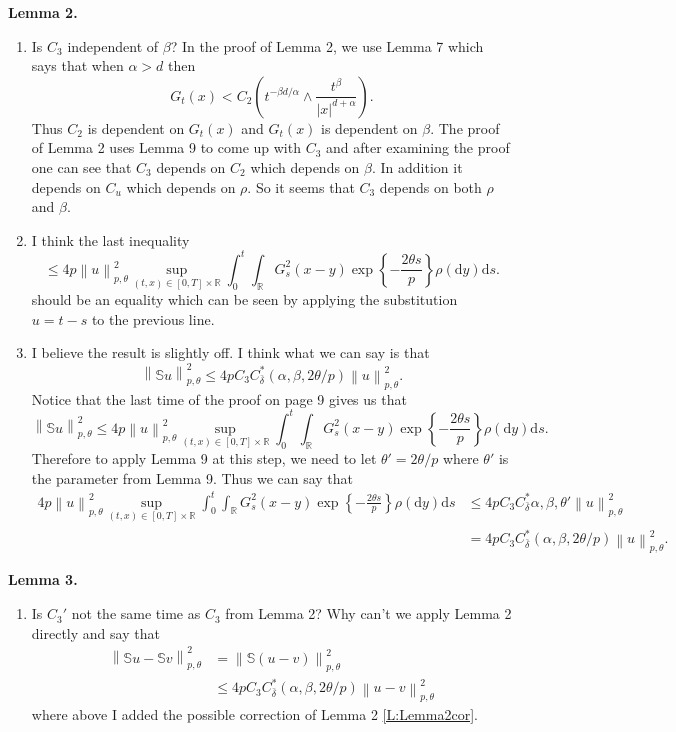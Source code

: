 \documentclass[a4paper,11pt]{article}
\numberwithin{equation}{section}
\numberwithin{equation}{section}
\theoremstyle{plain}
\theoremstyle{definition}
\newcommand{\ud}{\ensuremath{\mathrm{d} }}
\newcommand{\Norm}[1]{\left\|  #1   \right\|}
\newcommand{\R}{\mathbb{R}}
\begin{document}
\textbf{Lemma 2.} 
\begin{enumerate}
	\item 
Is $C_3$ independent of $\beta$? In the proof of Lemma 2, we use Lemma 7 which says that when $\alpha > d$ then 
		\[
			G_t(x) < C_2\left(t^{-\beta d/\alpha} \wedge \frac{t^\beta}{|x|^{d+\alpha}} \right).
		\]
	Thus $C_2$ is dependent on $G_t(x)$ and $G_t(x)$ is dependent on $\beta$. The proof of Lemma 2 uses Lemma 9 to come up with $C_3$ and after examining the proof one can see that $C_3$ depends on $C_2$ which depends on $\beta$. In addition it depends on $C_u$ which depends on $\rho$. So it seems that $C_3$ depends on both $\rho$ and $\beta$. 
	
	\item 
I think the last inequality 
	\[
		\le 4p\Norm{u}_{p,\theta}^2 \sup_{(t,x)\in[0,T]\times \R} \int_0^t\int_{\R} G^2_s(x-y)\exp\left\{-\frac{2\theta s}{p} \right\} \rho(\ud y) \ud s.
	\]
should be an equality which can be seen by applying the substitution $u=t-s$ to the previous line. 
	\item
I believe the result is slightly off. I think what we can say is that 
	\begin{equation}\label{L:Lemma2cor}
		\Norm{\mathbb{S}u}_{p,\theta}^2 \le 4pC_3C_{\bar{\delta}}^*(\alpha,\beta,2\theta/p) \Norm{u}_{p,\theta}^2.
	\end{equation}
Notice that the last time of the proof on page 9 gives us that 
	\[
		\Norm{\mathbb{S}u}_{p,\theta}^2 \le 4p\Norm{u}_{p,\theta}^2 \sup_{(t,x)\in[0,T]\times \R} \int_0^t\int_{\R} G^2_s(x-y)\exp\left\{-\frac{2\theta s}{p} \right\} \rho(\ud y) \ud s.
	\]
Therefore to apply Lemma 9 at this step, we need to let $\theta' = 2\theta/p$ where $\theta'$ is the parameter from Lemma 9. Thus we can say that 
	\begin{align*}
		4p\Norm{u}_{p,\theta}^2 \sup_{(t,x)\in[0,T]\times \R} \int_0^t\int_{\R} G^2_s(x-y)\exp\left\{-\frac{2\theta s}{p} \right\} \rho(\ud y) \ud s &\le 4pC_3C_{\bar{\delta}}^*{\alpha,\beta,\theta'}\Norm{u}_{p,\theta}^2
		\\& = 4pC_3C_{\bar{\delta}}^*(\alpha,\beta,2\theta/p) \Norm{u}_{p,\theta}^2.
	\end{align*}
\end{enumerate} 

\textbf{Lemma 3.}
\begin{enumerate}
	\item
Is $C_3'$ not the same time as $C_3$ from Lemma 2? Why can't we apply Lemma 2 directly and say that 
	\begin{align*}
		\Norm{\mathbb{S}u-\mathbb{S}v}_{p,\theta}^2 &= \Norm{\mathbb{S}(u-v)}_{p,\theta}^2
		\\&\le 4pC_3C_{\bar{\delta}}^*(\alpha,\beta,2\theta/p) \Norm{u-v}_{p,\theta}^2
	\end{align*}
where above I added the possible correction of Lemma 2 \eqref{L:Lemma2cor}. 
\end{enumerate}
\end{document}
